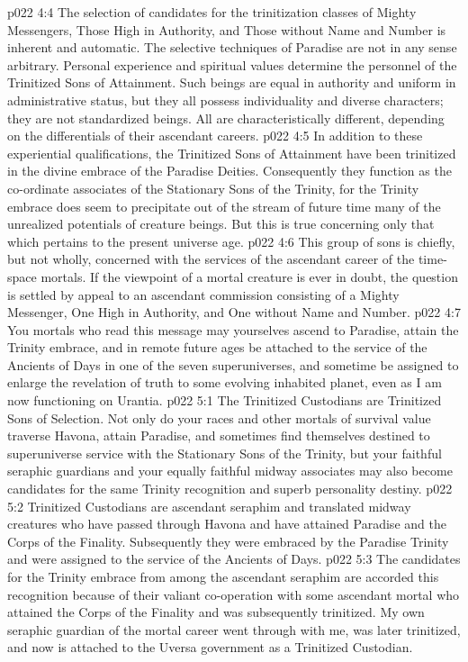 \pc \vs p022 4:4 The selection of candidates for the trinitization classes of Mighty Messengers, Those High in Authority, and Those without Name and Number is inherent and automatic. The selective techniques of Paradise are not in any sense arbitrary. Personal experience and spiritual values determine the personnel of the Trinitized Sons of Attainment. Such beings are equal in authority and uniform in administrative status, but they all possess individuality and diverse characters; they are not standardized beings. All are characteristically different, depending on the differentials of their ascendant careers.
\vs p022 4:5 In addition to these experiential qualifications, the Trinitized Sons of Attainment have been trinitized in the divine embrace of the Paradise Deities. Consequently they function as the co\hyp{}ordinate associates of the Stationary Sons of the Trinity, for the Trinity embrace does seem to precipitate out of the stream of future time many of the unrealized potentials of creature beings. But this is true concerning only that which pertains to the present universe age.
\vs p022 4:6 This group of sons is chiefly, but not wholly, concerned with the services of the ascendant career of the time\hyp{}space mortals. If the viewpoint of a mortal creature is ever in doubt, the question is settled by appeal to an ascendant commission consisting of a Mighty Messenger, One High in Authority, and One without Name and Number.
\vs p022 4:7 You mortals who read this message may yourselves ascend to Paradise, attain the Trinity embrace, and in remote future ages be attached to the service of the Ancients of Days in one of the seven superuniverses, and sometime be assigned to enlarge the revelation of truth to some evolving inhabited planet, even as I am now functioning on Urantia.\plusone
{}
\vs p022 5:1 The Trinitized Custodians are Trinitized Sons of Selection. Not only do your races and other mortals of survival value traverse Havona, attain Paradise, and sometimes find themselves destined to superuniverse service with the Stationary Sons of the Trinity, but your faithful seraphic guardians and your equally faithful midway associates may also become candidates for the same Trinity recognition and superb personality destiny.
\vs p022 5:2 Trinitized Custodians are ascendant seraphim and translated midway creatures who have passed through Havona and have attained Paradise and the Corps of the Finality. Subsequently they were embraced by the Paradise Trinity and were assigned to the service of the Ancients of Days.
\vs p022 5:3 The candidates for the Trinity embrace from among the ascendant seraphim are accorded this recognition because of their valiant co\hyp{}operation with some ascendant mortal who attained the Corps of the Finality and was subsequently trinitized. My own seraphic guardian of the mortal career went through with me, was later trinitized, and now is attached to the Uversa government as a Trinitized Custodian.
